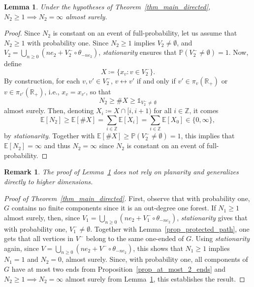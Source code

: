 \documentclass[a4paper, 11pt]{article} %
\theoremstyle{plain}
\newtheorem{lemma}[theorem]{Lemma}
\newtheorem{remark}[theorem]{Remark}
\newcommand{\E}{\mathbb{E}}
\newcommand{\R}{\mathbb{R}}
\newcommand{\Z}{\mathbb{Z}}
\newcommand{\1}{\mathds 1}
\renewcommand{\P}{\mathbb{P}}
\numberwithin{equation}{section}
\begin{document}
\begin{lemma}
    \label{lemma_N2_directed_dichotomy}
    Under the hypotheses of Theorem~\ref{thm_main_directed}, $N_2\geq1\implies N_2=\infty$ almost surely.
\end{lemma}

\begin{proof}
    Since $N_2$ is constant on an event of full-probability, let us assume that $N_2\geq 1$ with probability one. Since $N_2\geq 1$ implies $V_2\neq\emptyset$, and $V_2=\bigcup_{n\geq 0}(ne_2+V_2^-\circ\theta_{-ne_2})$, \emph{stationarity} ensures that $\P(V_2^-\neq\emptyset)=1$. Now, define
        \[X\coloneqq\{x_v:v\in V_2^-\}.\]
    By construction, for each $v,v'\in V_2^-$, $v\leftrightarrow v'$ if and only if $v'\in\pi_v(\R_+)$ or $v\in\pi_{v'}(\R_+)$, i.e., $x_v=x_{v'}$, so that
        \[N_2\geq\#X\geq\1_{V_2^-\neq\,\emptyset}\]
    almost surely. Then, denoting $X_i\coloneq X\cap[i,i+1)$ for all $i\in\Z$, it comes
        \[\E[N_2]\geq\E[\#X]=\sum_{i\in\Z}\E[X_i]=\sum_{i\in\Z}\E[X_0]\in\{0,\infty\},\]
    by \emph{stationarity}. Together with $\E[\#X]\geq\P(V^-_2\neq\emptyset)=1$, this implies that $\E[N_2]=\infty$ and thus $N_2=\infty$ since $N_2$ is constant on an event of full-probability.
\end{proof}


\begin{remark}
    The proof of Lemma~\ref{lemma_N2_directed_dichotomy} does not rely on \emph{planarity} and generalizes directly to higher dimensions.
\end{remark}


\begin{proof}[Proof of Theorem~\ref{thm_main_directed}]
    First, observe that with probability one, $G$ contains no finite components since it is an out-degree one forest. If $N_1\geq 1$ almost surely, then, since $V_1=\bigcup_{n\geq 0}(ne_2+V_1^-\circ\theta_{-ne_2})$, \emph{stationarity} gives that with probability one, $V_1^-\neq\emptyset$. Together with Lemma~\ref{prop_protected_path}, one gets that all vertices in $V^-$ belong to the same one-ended of $G$. Using \emph{stationarity} again, since $V=\bigcup_{n\geq 0} (ne_2+V^-\circ\theta_{-ne_2})$, this shows that $N_1\geq 1$ implies $N_1=1$ and $N_2=0$, almost surely. Since, with probability one, all components of $G$ have at most two ends from Proposition~\ref{prop_at_most_2_ends} and $N_2\geq 1\implies N_2=\infty$ almost surely from Lemma~\ref{lemma_N2_directed_dichotomy}, this establishes the result.
\end{proof}
\end{document}
